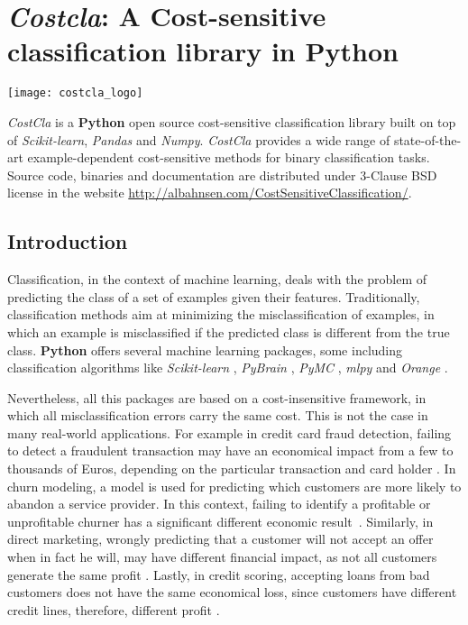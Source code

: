 \chapter{\textit{Costcla}: A Cost-sensitive classification library in \textbf{Python}}\label{ch:A}


\begin{center}
 \texttt{[image: costcla\_logo]}
\end{center}

\begin{remark}
\textit{CostCla} is a \textbf{Python} open source cost-sensitive classification library built on 
top of \textit{Scikit-learn}, \textit{Pandas} and \textit{Numpy}. \textit{CostCla} provides a wide 
range of state-of-the-art example-dependent cost-sensitive methods for binary classification tasks. 
Source code, binaries and documentation are distributed under 3-Clause BSD license in the website 
\url{http://albahnsen.com/CostSensitiveClassification/}.
\end{remark}
  
\section{Introduction}
\label{sec:9:intro}

Classification, in the context of machine learning, deals with the problem of predicting the class 
of a set of examples given their features. Traditionally, classification methods aim at minimizing 
the misclassification of examples, in which an example is misclassified if the predicted class is 
different from the true class. 
\textbf{Python} offers several machine learning packages, some including classification algorithms 
like \textit{Scikit-learn} \citep{Pedregosa2011}, \textit{PyBrain} \citep{Schaul2010}, 
\textit{PyMC} \citep{Patil2010}, \textit{mlpy} \citep{Albanese2012} and \textit{Orange} 
\citep{Demsar2013}.

Nevertheless, all this packages are based on a cost-insensitive framework, in which all 
misclassification errors carry the same cost. This is not the case in many real-world applications. 
For example in credit card fraud detection, failing to detect a fraudulent transaction may have 
an economical impact from a few to thousands of Euros, depending on the particular transaction 
and card holder \citep{Ngai2011a}. In churn modeling, a model is used for predicting which
customers are more likely to abandon a service provider. In this context, failing to identify a 
profitable or unprofitable churner has a significant different economic 
result~\citep{Verbraken2013}. Similarly, in direct marketing, wrongly predicting that a customer 
will not accept an offer when in fact he will, may have different financial impact, as not all 
customers generate the same profit \citep{Zadrozny2003}. Lastly, in credit scoring, accepting 
loans from bad customers does not have the same economical loss, since customers have different 
credit lines, therefore, different profit \citep{Verbraken2014}.


